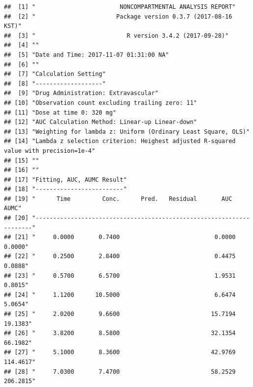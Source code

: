 \documentclass[12pt,]{krantz}
\begin{document}
\begin{verbatim}
##  [1] "                        NONCOMPARTMENTAL ANALYSIS REPORT"                           
##  [2] "                       Package version 0.3.7 (2017-08-16 KST)"                      
##  [3] "                          R version 3.4.2 (2017-09-28)"                             
##  [4] ""                                                                                   
##  [5] "Date and Time: 2017-11-07 01:31:00 NA"                                              
##  [6] ""                                                                                   
##  [7] "Calculation Setting"                                                                
##  [8] "-------------------"                                                                
##  [9] "Drug Administration: Extravascular"                                                 
## [10] "Observation count excluding trailing zero: 11"                                      
## [11] "Dose at time 0: 320 mg"                                                             
## [12] "AUC Calculation Method: Linear-up Linear-down"                                      
## [13] "Weighting for lambda z: Uniform (Ordinary Least Square, OLS)"                       
## [14] "Lambda z selection criterion: Heighest adjusted R-squared value with precision=1e-4"
## [15] ""                                                                                   
## [16] ""                                                                                   
## [17] "Fitting, AUC, AUMC Result"                                                          
## [18] "-------------------------"                                                          
## [19] "      Time         Conc.      Pred.   Residual       AUC       AUMC"                
## [20] "---------------------------------------------------------------------"              
## [21] "     0.0000       0.7400                           0.0000     0.0000"               
## [22] "     0.2500       2.8400                           0.4475     0.0888"               
## [23] "     0.5700       6.5700                           1.9531     0.8015"               
## [24] "     1.1200      10.5000                           6.6474     5.0654"               
## [25] "     2.0200       9.6600                          15.7194    19.1383"               
## [26] "     3.8200       8.5800                          32.1354    66.1982"               
## [27] "     5.1000       8.3600                          42.9769   114.4617"               
## [28] "     7.0300       7.4700                          58.2529   206.2815"               

\end{verbatim}
\end{document}

